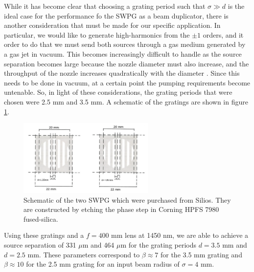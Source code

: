 While it has become clear that choosing a grating period such that $\sigma\gg d$ is the ideal case for the performance fo the SWPG as a beam duplicator, there is another consideration that must be made for our specific application.  In particular, we would like to generate high-harmonics from the $\pm1$ orders, and it order to do that we must send both sources through a gas medium generated by a gas jet in vacuum.  This becomes increasingly difficult to handle as the source separation becomes large because the nozzle diameter must also increase, and the throughput of the nozzle increases quadratically with the diameter \cite{scolesAtomicMolecularBeam1988}.  Since this needs to be done in vacuum, at a certain point the pumping requirements become untenable.  So, in light of these considerations, the grating periods that were chosen were 2.5 mm and 3.5 mm.  A schematic of the gratings are shown in figure \ref{fig:silios_sketch}.
\begin{figure}
	\centering
	\includegraphics[width=0.6\textwidth]{figures/Two_source/silios_sketch.png}
	\caption[Drawing of SWPGs purchased from Silios]{Schematic of the two SWPG which were purchased from Silios.  They are constructed by etching the phase step in Corning HPFS 7980 fused-silica.}
	\label{fig:silios_sketch}
\end{figure}
Using these gratings and a $f=400$ mm lens at 1450 nm, we are able to achieve a source separation of 331 $\mu$m and 464 $\mu$m for the grating periods $d=3.5$ mm and $d=2.5$ mm.  These parameters correspond to $\beta\approx7$ for the 3.5 mm grating and $\beta\approx10$ for the 2.5 mm grating for an input beam radius of $\sigma=4$ mm.

